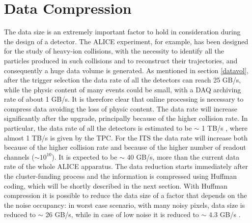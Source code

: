 \section{Data Compression}
The data size is an extremely important factor to hold in consideration during the design of a detector. The ALICE experiment, for example, has been designed for the study of heavy-ion collisions, with the necessity to identify all the particles produced in such collisions and to reconstruct their trajectories, and consequently a huge data volume is generated. As mentioned in section \ref{datavol}, after the trigger selection the data rate of all the detectors can reach 25 GB/s, while the physic content of many events could be small, with a DAQ archiving rate of about 1 GB/s. It is therefore clear that online processing is necessary to compress data avoiding the loss of physic content. The data rate will increase significantly after the upgrade, principally because of the higher collision rate. In particular, the data rate of all the detectors is estimated to be $\sim$ 1 TB/s \cite{o2}, where almost 1 TB/s is given by the TPC. For the ITS the data rate will increase both because of the higher collision rate and because of the higher number of readout channels ($\sim 10^{10}$). It is expected to be $\sim$ 40 GB/s, more than the current data rate of the whole ALICE apparatus. The data reduction starts immediately after the cluster-funding process and the information is compressed using Huffman coding, which will be shortly described in the next section. With Huffman compression it is possible to reduce the data size of a factor that depends on the the noise occupancy: in worst case scenario, with many noisy pixels, data size is reduced to  $\sim$ 26 GB/s, while in case of low noise it is reduced to $\sim$ 4.3 GB/s \cite{o2}.
